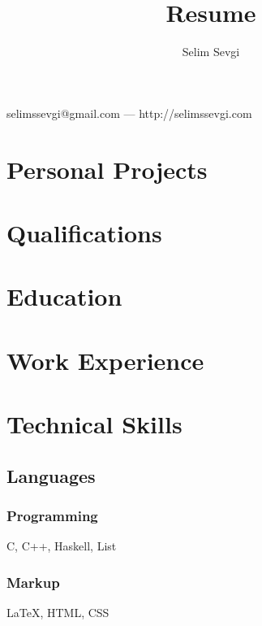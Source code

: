 \documentclass{article}
\makeatletter
\renewcommand{\maketitle}{
\begin{center}

{\huge\bfseries
\theauthor}

\vspace{.25em}

selimssevgi@gmail.com --- http://selimssevgi.com

\end{center}
}
\makeatother
\begin{document}
\title{Resume}
\author{Selim Sevgi}

\maketitle

\section{Personal Projects}
\section{Qualifications}
\section{Education}
\section{Work Experience}
\section{Technical Skills}
\subsection{Languages}
\subsubsection{Programming}
C, C++, Haskell, List
\subsubsection{Markup}
{\LaTeX}, HTML, CSS
\end{document}
